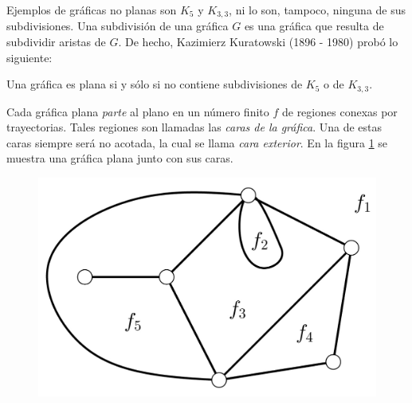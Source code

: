 Ejemplos de gráficas no planas son $K_{5}$ y $K_{3,3}$, ni lo son, tampoco, ninguna de sus subdivisiones. Una subdivisión de una gráfica $G$ es una gráfica que resulta de subdividir aristas de $G$. De hecho,  Kazimierz Kuratowski (1896 - 1980) probó lo siguiente:

\begin{teo}
Una gráfica es plana si y sólo si no contiene subdivisiones de $K_{5}$ o de $K_{3,3}$.
\end{teo}

Cada gráfica plana \textit{parte} al plano en un número finito $f$ de regiones conexas por trayectorias. Tales regiones son llamadas las \textit{caras de la gráfica}. Una de estas caras siempre será no acotada, la cual se llama \textit{cara exterior}. En la figura \ref{fig:plana} se muestra una gráfica plana junto con sus caras.

\begin{figure}[h]
    \centering
    \includegraphics[scale=0.2]{img/imgchapter4/graficaplana.jpg}
    \caption{}
    \label{fig:plana}
\end{figure}

